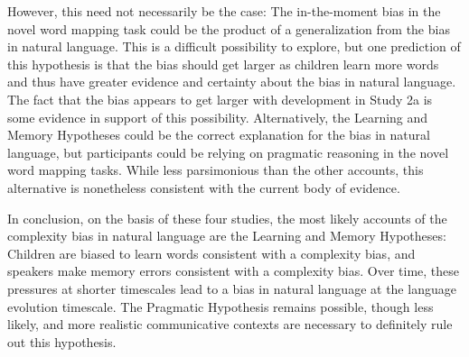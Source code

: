 However, this need not necessarily be the case: The in-the-moment bias in the novel word mapping task could be the product of a generalization from the bias in natural language. This is a difficult possibility to explore, but one prediction of this hypothesis is that the bias should get larger as children learn more words and thus have greater evidence and certainty about the bias in natural language. The fact that the bias appears to get larger with development in Study 2a is some evidence in support of this possibility. Alternatively, the Learning and Memory Hypotheses could be the correct explanation for the bias in natural language, but participants could  be relying on pragmatic reasoning in the novel word mapping tasks.  While less parsimonious than the other accounts, this alternative is nonetheless consistent with the current body of evidence.

In conclusion, on the basis of these four studies, the most likely accounts of the complexity bias in natural language are the Learning and Memory Hypotheses: Children are biased to learn words consistent with a complexity bias, and speakers make memory errors consistent with a complexity bias. Over time, these pressures at shorter timescales lead to a bias in natural language at the language evolution timescale. The Pragmatic Hypothesis remains possible, though less likely, and more realistic communicative contexts are necessary to  definitely rule out this hypothesis.




%


